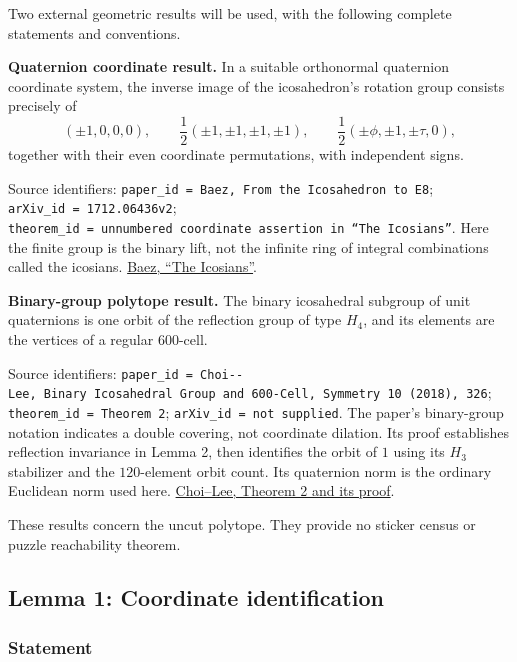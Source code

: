 \documentclass[
  10pt,
  a4paper,
]{article}
\begin{document}
Two external geometric results will be used, with the following complete
statements and conventions.

\textbf{Quaternion coordinate result.} In a suitable orthonormal
quaternion coordinate system, the inverse image of the icosahedron's
rotation group consists precisely of \begin{equation}
(\pm1,0,0,0),\qquad
\frac12(\pm1,\pm1,\pm1,\pm1),\qquad
\frac12(\pm\phi,\pm1,\pm\tau,0),
\end{equation} together with their even coordinate permutations, with
independent signs.

Source identifiers:
\texttt{paper\_id\ =\ Baez,\ From\ the\ Icosahedron\ to\ E8};
\texttt{arXiv\_id\ =\ 1712.06436v2};
\texttt{theorem\_id\ =\ unnumbered\ coordinate\ assertion\ in\ “The\ Icosians”}.
Here the finite group is the binary lift, not the infinite ring of
integral combinations called the icosians.
\href{https://arxiv.org/html/1712.06436v2}{Baez, ``The Icosians''}.

\textbf{Binary-group polytope result.} The binary icosahedral subgroup
of unit quaternions is one orbit of the reflection group of type
\(H_4\), and its elements are the vertices of a regular 600-cell.

Source identifiers:
\texttt{paper\_id\ =\ Choi-\/-Lee,\ Binary\ Icosahedral\ Group\ and\ 600-Cell,\ Symmetry\ 10\ (2018),\ 326};
\texttt{theorem\_id\ =\ Theorem\ 2};
\texttt{arXiv\_id\ =\ not\ supplied}. The paper's binary-group notation
indicates a double covering, not coordinate dilation. Its proof
establishes reflection invariance in Lemma 2, then identifies the orbit
of \(1\) using its \(H_3\) stabilizer and the \(120\)-element orbit
count. Its quaternion norm is the ordinary Euclidean norm used here.
\href{https://pdfs.semanticscholar.org/0fef/c9c8c31093da12262c8f6740da46c0dfb46e.pdf}{Choi--Lee,
Theorem 2 and its proof}.

These results concern the uncut polytope. They provide no sticker census
or puzzle reachability theorem.

\subsection{Lemma 1: Coordinate
identification}\label{lemma-1-coordinate-identification}

\subsubsection{Statement}\label{statement}
\end{document}
